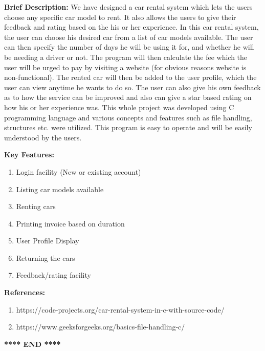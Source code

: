 \documentclass[12pt]{article}
\begin{document}
\noindent
\textbf{Brief Description:}
\newline
We have designed a car rental system which lets the users choose any specific car model to rent. It also allows the users to give their feedback and rating based on the his or her experience. 
\newline
\newline
In this car rental system, the user can choose his desired car from a list of car models available. The user can then specify the number of days he will be using it for, and whether he will be needing a driver or not. The program will then calculate the fee which the user will be urged to pay by visiting a website (for obvious reasons website is non-functional). The rented car will then be added to the user profile, which the user can view anytime he wants to do so. The user can also give his own feedback as to how the service can be improved and also can give a star based rating on how his or her experience was. This whole project was developed using C programming language and various concepts and features such as file handling, structures etc. were utilized. This program is easy to operate and will be easily understood by the users.

\noindent
\textbf{Key Features:}
\begin{enumerate}
    \item Login facility (New or existing account)
    \item Listing car models available
    \item Renting cars
    \item Printing invoice based on duration
    \item User Profile Display
    \item Returning the cars
    \item Feedback/rating facility
\end{enumerate}

\noindent
\textbf{References:}
\begin{enumerate}
    \item https://code-projects.org/car-rental-system-in-c-with-source-code/
    \item https://www.geeksforgeeks.org/basics-file-handling-c/
\end{enumerate}


\begin{center}
    \textbf{**** END ****}
\end{center}
\end{document}
